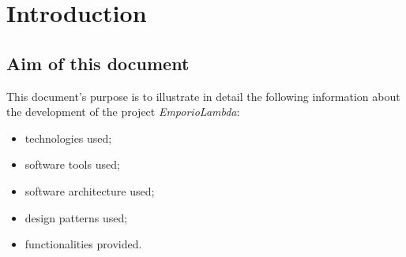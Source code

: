 \section{Introduction}
\subsection{Aim of this document}
This document's purpose is to illustrate in detail the following information about the development of the project \textit{EmporioLambda}:
\begin{itemize}
\item technologies used;
\item software tools used;
\item software architecture used;
\item design patterns used;
\item functionalities provided.
\end{itemize}
